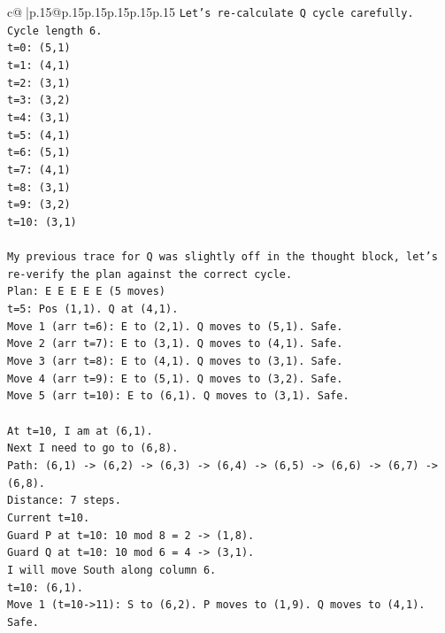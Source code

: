 \documentclass{article}
\begin{document}
{\begin{supertabular}{c@{$\;$}|p{.15\linewidth}@{}p{.15\linewidth}p{.15\linewidth}p{.15\linewidth}p{.15\linewidth}p{.15\linewidth}}
{{{\texttt{Let's re{-}calculate Q cycle carefully.} \\
\texttt{Cycle length 6.} \\
\texttt{t=0: (5,1)} \\
\texttt{t=1: (4,1)} \\
\texttt{t=2: (3,1)} \\
\texttt{t=3: (3,2)} \\
\texttt{t=4: (3,1)} \\
\texttt{t=5: (4,1)} \\
\texttt{t=6: (5,1)} \\
\texttt{t=7: (4,1)} \\
\texttt{t=8: (3,1)} \\
\texttt{t=9: (3,2)} \\
\texttt{t=10: (3,1)} \\
\\ 
\texttt{My previous trace for Q was slightly off in the thought block, let's re{-}verify the plan against the correct cycle.} \\
\texttt{Plan: E E E E E (5 moves)} \\
\texttt{t=5: Pos (1,1). Q at (4,1).} \\
\texttt{Move 1 (arr t=6): E to (2,1). Q moves to (5,1). Safe.} \\
\texttt{Move 2 (arr t=7): E to (3,1). Q moves to (4,1). Safe.} \\
\texttt{Move 3 (arr t=8): E to (4,1). Q moves to (3,1). Safe.} \\
\texttt{Move 4 (arr t=9): E to (5,1). Q moves to (3,2). Safe.} \\
\texttt{Move 5 (arr t=10): E to (6,1). Q moves to (3,1). Safe.} \\
\\ 
\texttt{At t=10, I am at (6,1).} \\
\texttt{Next I need to go to (6,8).} \\
\texttt{Path: (6,1) {-}> (6,2) {-}> (6,3) {-}> (6,4) {-}> (6,5) {-}> (6,6) {-}> (6,7) {-}> (6,8).} \\
\texttt{Distance: 7 steps.} \\
\texttt{Current t=10.} \\
\texttt{Guard P at t=10: 10 mod 8 = 2 {-}> (1,8).} \\
\texttt{Guard Q at t=10: 10 mod 6 = 4 {-}> (3,1).} \\
\texttt{I will move South along column 6.} \\
\texttt{t=10: (6,1).} \\
\texttt{Move 1 (t=10{-}>11): S to (6,2). P moves to (1,9). Q moves to (4,1). Safe.} \\
}}}
\end{supertabular}}
\end{document}
